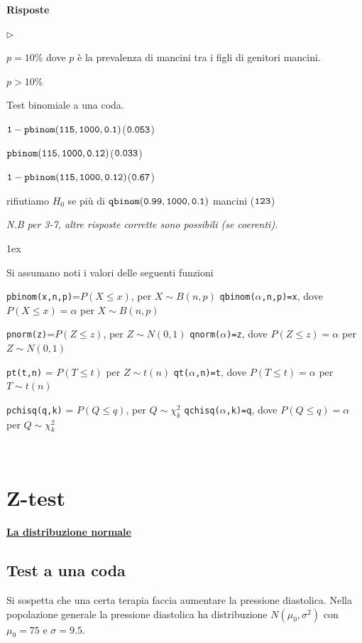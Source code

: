 \documentclass[12pt,openany]{book}
\newcommand{\mylabel}[1]{{\footnotesize\textsf{#1}}\hfill}
\renewenvironment{itemize}
  {\begin{list}{$\triangleright$}{%
   \setlength{\parskip}{0mm}
   \setlength{\topsep}{.2\baselineskip}
   \setlength{\rightmargin}{0mm}
   \setlength{\listparindent}{0mm}
   \setlength{\itemindent}{0mm}
   \setlength{\labelwidth}{3ex}
   \setlength{\itemsep}{.4\baselineskip}
   \setlength{\parsep}{0mm}
   \setlength{\partopsep}{0mm}
   \setlength{\labelsep}{1ex}
   \setlength{\leftmargin}{\labelwidth+\labelsep}
   \let\makelabel\mylabel}}{%
   \end{list}\vspace*{-1.3mm}}
\theoremstyle{mio}
\theoremstyle{liscio}
\begin{document}
\textbf{Risposte}

\begin{itemize}
\item[1.] $p=10\%$ dove $p$ è la prevalenza di mancini tra i figli di genitori mancini.
\item[2.]  $p>10\%$ 
\item[3.] Test binomiale a una coda.
\item[4.]  $\tt 1 - pbinom(115,1000,0.1)$\hfill ($\tt 0.053$)
\item[5.]  $\tt pbinom(115,1000,0.12)$\hfill ($\tt 0.033$)
\item[6.]  $\tt 1- pbinom(115,1000,0.12)$\hfill ($\tt 0.67$)
\item[7.]  rifiutiamo $H_0$ se più di $\tt qbinom(0.99,1000,0.1)$ mancini \hfill ($\tt 123$) 
\end{itemize}

\textit{N.B per 3-7, altre risposte corrette sono possibili (se coerenti).}

\parskip1ex
{\hrulefill\scriptsize

Si assumano noti i valori delle seguenti funzioni

{\tt pbinom(x,n,p)}=$P(X\le x)$, per $X\sim B(n,p)$
\hfill 
{\tt qbinom($\alpha$,n,p)=x},  dove $P(X\le x)=\alpha$ per $X\sim B(n,p)$

{\tt pnorm(z)}=$P(Z\le z)$, per $Z\sim N(0,1)$
\hfill 
{\tt qnorm($\alpha$)=z},  dove $P(Z\le z)=\alpha$ per $Z\sim N(0,1)$

{\tt pt(t,n)} = $P(T\le t)$ per $Z\sim t(n)$
\hfill
{\tt qt($\alpha$,n)=t}, dove $P(T\le t)=\alpha$ per $T\sim t(n)$

{\tt pchisq(q,k)} = $P(Q\le q)$, per $Q\sim \chi^2_k$
\hfill
{\tt qchisq($\alpha$,k)=q},  dove $P(Q\le q)=\alpha$ per $Q\sim \chi^2_k$
\par
}

\hfill{}\clearpage\
\section{Z-test}
\label{Z-test}
\hfill\textbf{{\color{brown}\hyperref[distribuzione normale]{La distribuzione normale \faShare}}}
\subsection{Test a una coda}
Si sospetta che una certa terapia faccia aumentare la pressione diastolica. Nella popolazione generale la pressione diastolica ha distribuzione $N(\mu_0,\sigma^2)$ con $\mu_0=75$ e $\sigma=9.5$. 
\end{document}
